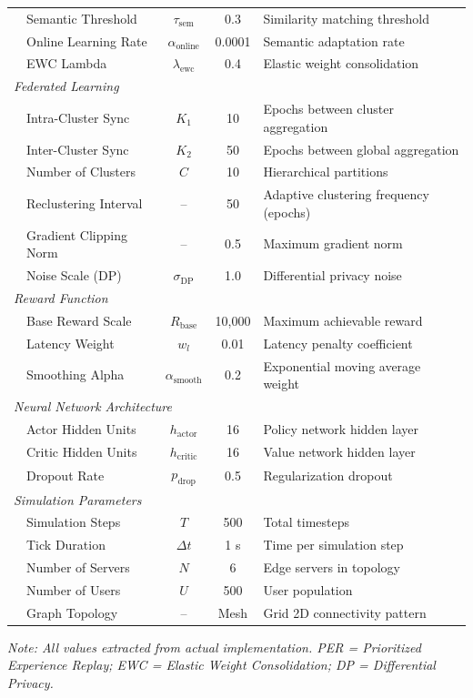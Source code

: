 \begin{table}[t]
{\begin{tabular}{@{}llccp{6cm}@{}}
& Semantic Threshold & $\tau_{\text{sem}}$ & 0.3 & Similarity matching threshold \\
& Online Learning Rate & $\alpha_{\text{online}}$ & 0.0001 & Semantic adaptation rate \\
& EWC Lambda & $\lambda_{\text{ewc}}$ & 0.4 & Elastic weight consolidation \\
\midrule
\multicolumn{5}{l}{\textit{Federated Learning}} \\
& Intra-Cluster Sync & $K_1$ & 10 & Epochs between cluster aggregation \\
& Inter-Cluster Sync & $K_2$ & 50 & Epochs between global aggregation \\
& Number of Clusters & $C$ & 10 & Hierarchical partitions \\
& Reclustering Interval & -- & 50 & Adaptive clustering frequency (epochs) \\
& Gradient Clipping Norm & -- & 0.5 & Maximum gradient norm \\
& Noise Scale (DP) & $\sigma_{\text{DP}}$ & 1.0 & Differential privacy noise \\
\midrule
\multicolumn{5}{l}{\textit{Reward Function}} \\
& Base Reward Scale & $R_{\text{base}}$ & 10,000 & Maximum achievable reward \\
& Latency Weight & $w_l$ & 0.01 & Latency penalty coefficient \\
& Smoothing Alpha & $\alpha_{\text{smooth}}$ & 0.2 & Exponential moving average weight \\
\midrule
\multicolumn{5}{l}{\textit{Neural Network Architecture}} \\
& Actor Hidden Units & $h_{\text{actor}}$ & 16 & Policy network hidden layer \\
& Critic Hidden Units & $h_{\text{critic}}$ & 16 & Value network hidden layer \\
& Dropout Rate & $p_{\text{drop}}$ & 0.5 & Regularization dropout \\
\midrule
\multicolumn{5}{l}{\textit{Simulation Parameters}} \\
& Simulation Steps & $T$ & 500 & Total timesteps \\
& Tick Duration & $\Delta t$ & 1 s & Time per simulation step \\
& Number of Servers & $N$ & 6 & Edge servers in topology \\
& Number of Users & $U$ & 500 & User population \\
& Graph Topology & -- & Mesh & Grid 2D connectivity pattern \\
\bottomrule
\end{tabular}%
}
\vspace{0.1cm}
\footnotesize
\textit{Note: All values extracted from actual implementation. PER = Prioritized Experience Replay; EWC = Elastic Weight Consolidation; DP = Differential Privacy.}
\end{table}
